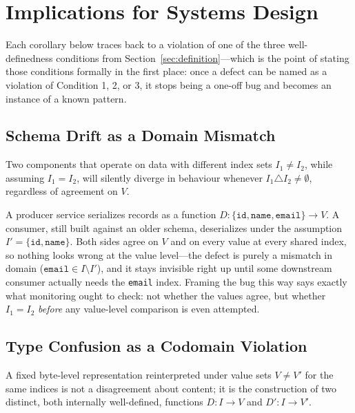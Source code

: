 \section{Implications for Systems Design}
\label{sec:implications}

Each corollary below traces back to a violation of one of the three
well-definedness conditions from Section~\ref{sec:definition}---which is
the point of stating those conditions formally in the first place: once a
defect can be named as a violation of Condition 1, 2, or 3, it stops being
a one-off bug and becomes an instance of a known pattern.

\subsection{Schema Drift as a Domain Mismatch}

\begin{corollary}
\label{cor:schema-drift}
Two components that operate on data with different index sets
$I_1 \neq I_2$, while assuming $I_1 = I_2$, will silently diverge in
behaviour whenever $I_1 \triangle I_2 \neq \emptyset$, regardless of
agreement on $V$.
\end{corollary}

\begin{example}
A producer service serializes records as a function
$D : \{\mathtt{id}, \mathtt{name}, \mathtt{email}\} \to V$. A consumer,
still built against an older schema, deserializes under the assumption
$I' = \{\mathtt{id}, \mathtt{name}\}$. Both sides agree on $V$ and on
every value at every shared index, so nothing looks wrong at the value
level---the defect is purely a mismatch in domain
($\mathtt{email} \in I \setminus I'$), and it stays invisible right up
until some downstream consumer actually needs the \texttt{email} index.
Framing the bug this way says exactly what monitoring ought to check:
not whether the values agree, but whether $I_1 = I_2$ \emph{before} any
value-level comparison is even attempted.
\end{example}

\subsection{Type Confusion as a Codomain Violation}

\begin{corollary}
\label{cor:type-confusion}
A fixed byte-level representation reinterpreted under value sets
$V \neq V'$ for the same indices is not a disagreement about content;
it is the construction of two distinct, both internally well-defined,
functions $D : I \to V$ and $D' : I \to V'$.
\end{corollary}

